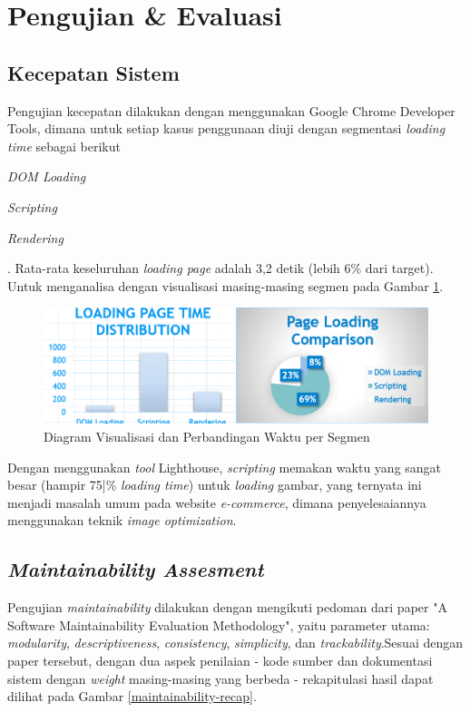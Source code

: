 \section{Pengujian \& Evaluasi}

\subsection{Kecepatan Sistem}
Pengujian kecepatan dilakukan dengan menggunakan Google Chrome Developer Tools, dimana untuk setiap kasus penggunaan diuji dengan segmentasi \textit{loading time} sebagai berikut \begin{inlinelist}
	\item \textit{DOM Loading}
	\item \textit{Scripting}
	\item \textit{Rendering}
\end{inlinelist}. Rata-rata keseluruhan \textit{loading page} adalah 3,2 detik (lebih 6\% dari target). Untuk menganalisa dengan visualisasi masing-masing segmen pada Gambar \ref{bar-chart-speed}.
\begin{figure}[b]
	\centering
	\includegraphics[width=.4\textwidth]{images/bab5/speed/combined.png}
	\caption{Diagram Visualisasi dan Perbandingan Waktu per Segmen}
	\label{bar-chart-speed}
\end{figure}
	Dengan menggunakan \textit{tool} Lighthouse, \textit{scripting} memakan waktu yang sangat besar (hampir 75|\% \textit{loading time}) untuk \textit{loading} gambar, yang ternyata ini menjadi masalah umum pada website \textit{e-commerce}, dimana penyelesaiannya menggunakan teknik \textit{image optimization}.

\subsection{\textit{Maintainability Assesment}}
Pengujian \textit{maintainability} dilakukan dengan mengikuti pedoman dari paper "A Software Maintainability Evaluation Methodology"\cite{peercy_software_nodate}, yaitu parameter utama: \textit{modularity}, \textit{descriptiveness}, \textit{consistency}, \textit{simplicity}, dan \textit{trackability}.Sesuai dengan paper tersebut, dengan dua aspek penilaian - kode sumber dan dokumentasi sistem dengan \textit{weight} masing-masing yang berbeda - rekapitulasi hasil dapat dilihat pada Gambar \ref{maintainability-recap}.

